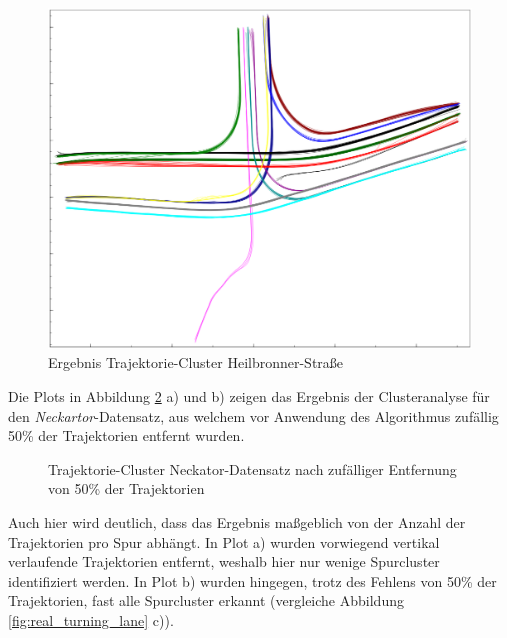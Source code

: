 \begin{figure}[H]
    \centering
    \includegraphics[width=0.31\linewidth]{resources/img/results/Heilbronner/filteredClusters_Heilbronner}
    \caption{Ergebnis Trajektorie-Cluster Heilbronner-Straße}
    \label{fig:results_clusters_heilbronner}
\end{figure}

Die Plots in Abbildung \ref{fig:results_clusters_neckartor} a) und b) zeigen das Ergebnis der Clusteranalyse für
den \textit{Neckartor}-Datensatz, aus welchem vor Anwendung des Algorithmus zufällig 50\% der Trajektorien entfernt wurden.

\begin{figure}[H]
    \centering
    \qquad \qquad 
    \caption{Trajektorie-Cluster Neckator-Datensatz nach zufälliger Entfernung von 50\% der Trajektorien}
    \label{fig:results_clusters_neckartor}
\end{figure}

Auch hier wird deutlich, dass das Ergebnis maßgeblich von der Anzahl der Trajektorien pro Spur abhängt.
In Plot a) wurden vorwiegend vertikal verlaufende Trajektorien entfernt, weshalb hier nur wenige Spurcluster identifiziert werden.
In Plot b) wurden hingegen, trotz des Fehlens von 50\% der Trajektorien, fast alle Spurcluster erkannt
(vergleiche Abbildung \ref{fig:real_turning_lane} c)).

